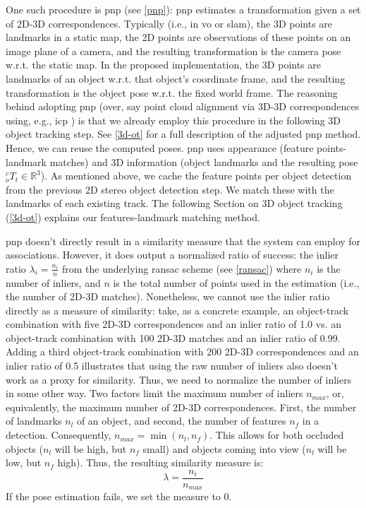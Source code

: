 \documentclass[headsepline, hidelinks, footsepline, footinclude=false, oneside, fontsize=11pt, paper=a4, listof=totoc, bibliography=totoc]{scrbook}
\begin{document}
One such procedure is \gls{pnp} (see \cref{pnp}):
\gls{pnp} estimates a transformation given a set of 2D-3D correspondences. Typically (i.e., in \gls{vo} or \gls{slam}), the 3D points are landmarks in a static map, the 2D points are observations of these
points on an image plane of a camera, and the resulting transformation is the camera pose w.r.t. the static map.
In the proposed implementation, the 3D points are landmarks of an object w.r.t. that object's coordinate frame, and the resulting transformation is the object pose w.r.t. the fixed world frame.
The reasoning behind adopting \gls{pnp} (over, say point cloud alignment via 3D-3D correspondences using, e.g., \gls{icp} \cite{chenObjectModellingRegistration1992}) is that we already employ this procedure in the following 3D object tracking step.
See \cref{3d-ot} for a full description of the adjusted \gls{pnp} method. 
Hence, we can reuse the computed poses. 
\gls{pnp} uses appearance (feature points-landmark matches) and 3D information (object landmarks and the resulting pose \({}^{c}_{o}T_t \in \mathbb{R}^3\)). 
As mentioned above, we cache the feature points per object detection from the previous 2D stereo object detection step. 
We match these with the landmarks of each existing track.
The following Section on 3D object tracking (\cref{3d-ot}) explains our features-landmark matching method.

\gls{pnp} doesn't directly result in a similarity measure that the system can employ for associations. 
However, it does output a normalized ratio of success: the inlier ratio \(\lambda_i=\frac{n_i}{n}\) from the underlying \gls{ransac} scheme (see \cref{ransac}) where \(n_i\) is the number of inliers, and \(n\) is the total number of points used in the estimation (i.e., the number of 2D-3D matches). 
Nonetheless, we cannot use the inlier ratio directly as a measure of similarity: take, as a concrete example, an object-track combination with five 2D-3D correspondences and an inlier ratio of 1.0 vs. an object-track 
combination with 100 2D-3D matches and an inlier ratio of 0.99.
Adding a third object-track combination with 200 2D-3D correspondences and an inlier ratio of 0.5 illustrates that using the raw number of inliers also doesn't work as a proxy for similarity.
Thus, we need to normalize the number of inliers in some other way. 
Two factors limit the maximum number of inliers \(n_{max}\), or, equivalently, the maximum number of 2D-3D correspondences. 
First, the number of landmarks \(n_l\) of an object, and second, the number of features \(n_f\) in a detection. Consequently, \(n_{max} = \min(n_l, n_f)\). 
This allows for both occluded objects (\(n_l\) will be high, but \(n_f\) small) and objects 
coming into view (\(n_l\) will be low, but \(n_f\) high).
Thus, the resulting similarity measure is:
\begin{equation}
\lambda = \frac{n_i}{n_{max}} 
\end{equation}
If the pose estimation fails, we set the measure to 0.
\end{document}
